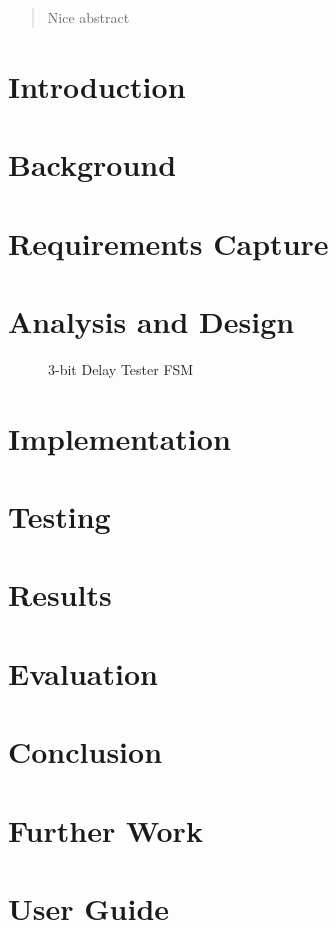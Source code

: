 \documentclass[12pt]{article}
\begin{document}


\setcounter{tocdepth}{2}
\tableofcontents

\newpage

\begin{abstract}
  Nice abstract
\end{abstract}

\section{Introduction}
\section{Background}
\section{Requirements Capture}
\section{Analysis and Design}
\begin{figure}[h]
  \centering
  
  \caption{3-bit Delay Tester FSM}
  \label{DelayTester}
\end{figure}
\section{Implementation}
\section{Testing}
\section{Results}
\section{Evaluation}
\section{Conclusion}
\section{Further Work}
\section{User Guide}

\newpage
\appendix

% 


\end{document}

